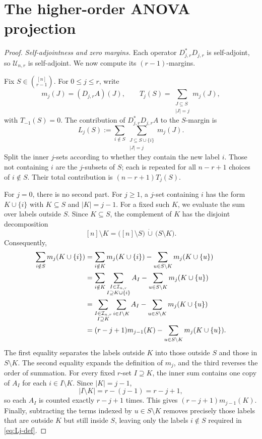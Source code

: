 \documentclass[11pt]{article}
\theoremstyle{plain}
\theoremstyle{definition}
\theoremstyle{remark}
\newcommand{\cI}{\mathcal I}
\newcommand{\cU}{\mathcal U}
\begin{document}
\appendix

\section{The higher-order ANOVA projection}
\label{app:higher-projection-proof}
\begin{proof}
\smallskip
\noindent\emph{Self-adjointness and zero margins.}
Each operator $D_{j,r}^\ast D_{j,r}$ is self-adjoint, so
$\cU_{n,r}$ is self-adjoint.  We now compute its $(r-1)$-margins.

Fix $S\in\binom{[n]}{r-1}$.  For $0\le j\le r$, write
\[
 m_j(J)=(D_{j,r}A)(J),
 \qquad
 T_j(S)=\sum_{\substack{J\subseteq S\\|J|=j}}m_j(J),
\]
with $T_{-1}(S)=0$.  The contribution of
$D_{j,r}^\ast D_{j,r}A$ to the $S$-margin is
\begin{equation}\label{eq:Lj-def}
 L_j(S)
 :=\sum_{i\notin S}
   \sum_{\substack{J\subseteq S\cup\{i\}\\|J|=j}}m_j(J).
\end{equation}
Split the inner $j$-sets according to whether they contain the new label $i$.
Those not containing $i$ are the $j$-subsets of $S$; each is repeated for all
$n-r+1$ choices of $i\notin S$.  Their total contribution is
$(n-r+1)T_j(S)$.

For $j=0$, there is no second part.  For $j\ge1$, a $j$-set containing
$i$ has the form $K\cup\{i\}$ with $K\subseteq S$ and $|K|=j-1$.
For a fixed such $K$, we evaluate the sum over labels outside $S$.  Since
$K\subseteq S$, the complement of $K$ has the disjoint decomposition
\[
 [n]\setminus K
 =\bigl([n]\setminus S\bigr)\,\dot\cup\,\bigl(S\setminus K\bigr).
\]
Consequently,
\begingroup
{}
\begin{align}
 \sum_{i\notin S}m_j(K\cup\{i\})
 &=\sum_{i\notin K}m_j(K\cup\{i\})
   -\sum_{u\in S\setminus K}m_j(K\cup\{u\}) \notag\\
 &=\sum_{i\notin K}
   \sum_{\substack{I\in\cI_{n,r}\\I\supseteq K\cup\{i\}}}A_I
   -\sum_{u\in S\setminus K}m_j(K\cup\{u\}) \notag\\
 &=\sum_{\substack{I\in\cI_{n,r}\\I\supseteq K}}
   \sum_{i\in I\setminus K}A_I
   -\sum_{u\in S\setminus K}m_j(K\cup\{u\}) \notag\\
 &=(r-j+1)m_{j-1}(K)
   -\sum_{u\in S\setminus K}m_j(K\cup\{u\}).
 \label{eq:fixed-K-count}
\end{align}
\endgroup
The first equality separates the labels outside $K$ into those outside $S$
and those in $S\setminus K$.  The second equality expands the definition of
$m_j$, and the third reverses the order of summation.  For every fixed
$r$-set $I\supseteq K$, the inner sum contains one copy of $A_I$ for each
$i\in I\setminus K$.  Since $|K|=j-1$,
\[
 |I\setminus K|=r-(j-1)=r-j+1,
\]
so each $A_I$ is counted exactly $r-j+1$ times.  This gives
$(r-j+1)m_{j-1}(K)$.  Finally, subtracting the terms indexed by
$u\in S\setminus K$ removes precisely those labels that are outside $K$ but
still inside $S$, leaving only the labels $i\notin S$ required in
\eqref{eq:Lj-def}.


\end{proof}
\end{document}
